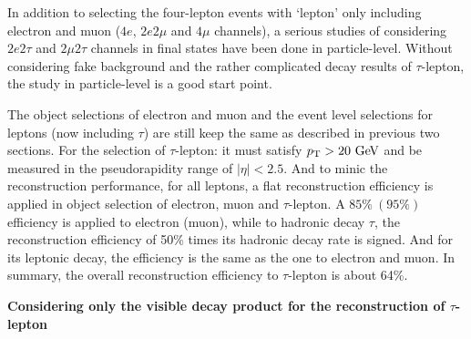
In addition to selecting the four-lepton events with `lepton' only including electron and muon ($4e$, $2e2\mu$ and $4\mu$ channels), 
a serious studies of considering $2e2\tau$ and $2\mu2\tau$ channels in final states have been done in particle-level.
Without considering fake background and the rather complicated decay results of $\tau$-lepton, the study in particle-level is a good start point.

The object selections of electron and muon and the event level selections for leptons (now including $\tau$) are still keep the same as described in previous two sections.
For the selection of $\tau$-lepton: it must satisfy $p_{\text{T}} > 20~\text{Ge\kern -0.1em V}$ and be measured in the pseudorapidity range of $\left|\eta \right|<2.5$.
And to minic the reconstruction performance, for all leptons, a flat reconstruction efficiency is applied in object selection of electron, muon and $\tau$-lepton.
A $85\%~(95\%)$ efficiency is applied to electron (muon),
while to hadronic decay $\tau$, the reconstruction efficiency of 50\% times its hadronic decay rate is signed. 
And for its leptonic decay, the efficiency is the same as the one to electron and muon. 
In summary, the overall reconstruction efficiency to $\tau$-lepton is about 64\%.

\textbf{Considering only the visible decay product for the reconstruction of $\tau$-lepton}

